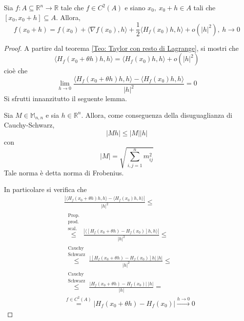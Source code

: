 \begin{theorem} \label{Teo: Taylor con resto di Peano}
    Sia $f: A \subseteq \mathbb{R}^n \to \mathbb{R}$ tale che $f \in C^2(A)$ e siano $x_0,\ x_0+h \in A$ tali che $[x_0, x_0+h] \subseteq A$. Allora, 
    \begin{equation}
        f(x_0+h)=f(x_0)+\langle \nabla f(x_0), h \rangle+ \frac{1}{2} \langle H_f(x_0)h, h\rangle + o(|h|^2),\ h \to 0 \label{Eq: Taylor con resto di Peano}
    \end{equation}
\end{theorem}
    \begin{proof}
        A partire dal teorema \ref{Teo: Taylor con resto di Lagrange}, si mostri che 
        \begin{equation}
            \langle H_f(x_0+\theta h)h, h \rangle = \langle H_f(x_0)h,h \rangle + o(|h|^2)
        \end{equation}
        cioè che 
        \begin{equation}
            \lim_{h\to 0}{\frac{\langle H_f(x_0+\theta h)h, h \rangle - \langle H_f(x_0)h, h \rangle}{|h|^2}}=0
        \end{equation}
        Si sfrutti innanzitutto il seguente lemma.
        \begin{lemma}
            Sia $M \in \mathbb{M}_{n,n}$ e sia $h \in \mathbb{R}^n$. Allora, come conseguenza della disuguaglianza di Cauchy-Schwarz, 
            \begin{equation}
                |Mh| \leq |M| |h|
            \end{equation}
            con 
            \begin{equation} \label{Eq: Norma di Frobenius}
                |M|=\sqrt{\sum\limits_{i,j=1}^{n}{m_{ij}^2}}
            \end{equation}
            Tale norma è detta norma di Frobenius.
        \end{lemma}
        In particolare si verifica che
        \begin{equation}
            \begin{aligned}
                &\frac{|\langle H_f(x_0+\theta h)h, h \rangle - \langle H_f(x_0)h, h\rangle|}{|h|^2}\leq\\
                &\overset{\substack{\text{Prop.}\\\text{prod.}\\ \text{scal.}}}{\leq}\frac{|\langle [H_f(x_0+\theta h)-H_f(x_0)]h, h \rangle|}{|h|^2} \leq\\
                &\overset{\substack{\text{Cauchy}\\\text{Schwarz}}}{\leq} \frac{|[H_f(x_0+\theta h)-H_f(x_0)]h|\ |h|}{|h|^2} \leq\\
                &\overset{\substack{\text{Cauchy}\\\text{Schwarz}}}{\leq} \frac{|H_f(x_0+\theta h)-H_f(x_0)|\ |h|}{|h|} =\\
                &\overset{f \in C^2(A)}{=}|H_f(x_0+\theta h)-H_f(x_0)| \overset{h \to 0}{\to} 0
            \end{aligned}
        \end{equation}
    \end{proof}
